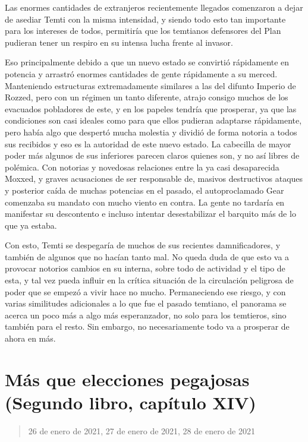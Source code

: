 \documentclass[
]{book}
\begin{document}
Las enormes cantidades de extranjeros recientemente llegados comenzaron a dejar de asediar Temti con la misma intensidad, y siendo todo esto tan importante para los intereses de todos, permitiría que los temtianos defensores del Plan pudieran tener un respiro en su intensa lucha frente al invasor.

Eso principalmente debido a que un nuevo estado se convirtió rápidamente en potencia y arrastró enormes cantidades de gente rápidamente a su merced. Manteniendo estructuras extremadamente similares a las del difunto Imperio de Rozzed, pero con un régimen un tanto diferente, atrajo consigo muchos de los evacuados pobladores de este, y en los papeles tendría que prosperar, ya que las condiciones son casi ideales como para que ellos pudieran adaptarse rápidamente, pero había algo que despertó mucha molestia y dividió de forma notoria a todos sus recibidos y eso es la autoridad de este nuevo estado. La cabecilla de mayor poder más algunos de sus inferiores parecen claros quienes son, y no así libres de polémica. Con notorias y novedosas relaciones entre la ya casi desaparecida Moxxed, y graves acusaciones de ser responsable de, masivos destructivos ataques y posterior caída de muchas potencias en el pasado, el autoproclamado Gear comenzaba su mandato con mucho viento en contra. La gente no tardaría en manifestar su descontento e incluso intentar desestabilizar el barquito más de lo que ya estaba.

Con esto, Temti se despegaría de muchos de sus recientes damnificadores, y también de algunos que no hacían tanto mal. No queda duda de que esto va a provocar notorios cambios en su interna, sobre todo de actividad y el tipo de esta, y tal vez pueda influir en la crítica situación de la circulación peligrosa de poder que se empezó a vivir hace no mucho. Permaneciendo ese riesgo, y con varias similitudes adicionales a lo que fue el pasado temtiano, el panorama se acerca un poco más a algo más esperanzador, no solo para los temtieros, sino también para el resto. Sin embargo, no necesariamente todo va a prosperar de ahora en más.

\hypertarget{muxe1s-que-elecciones-pegajosas-segundo-libro-capuxedtulo-xiv}{%
\section{Más que elecciones pegajosas (Segundo libro, capítulo XIV)}\label{muxe1s-que-elecciones-pegajosas-segundo-libro-capuxedtulo-xiv}}

\begin{quote}
26 de enero de 2021, 27 de enero de 2021, 28 de enero de 2021
\end{quote}
\end{document}
